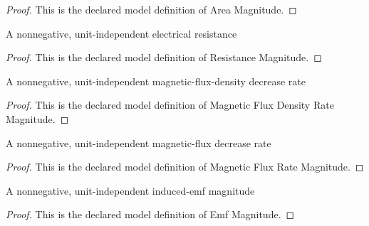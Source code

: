 \begin{proof}
  This is the declared model definition of Area Magnitude.
\end{proof}
\begin{definition}
  \label{def:physics:phyx-mini-0926:phyxminiproblems-problemphyxmini0926-resistancemagnitude}
  A nonnegative, unit-independent electrical resistance
\end{definition}
\begin{proof}
  This is the declared model definition of Resistance Magnitude.
\end{proof}
\begin{definition}
  \label{def:physics:phyx-mini-0926:phyxminiproblems-problemphyxmini0926-magneticfluxdensityratemagnitude}
  A nonnegative, unit-independent magnetic-flux-density decrease rate
\end{definition}
\begin{proof}
  This is the declared model definition of Magnetic Flux Density Rate Magnitude.
\end{proof}
\begin{definition}
  \label{def:physics:phyx-mini-0926:phyxminiproblems-problemphyxmini0926-magneticfluxratemagnitude}
  A nonnegative, unit-independent magnetic-flux decrease rate
\end{definition}
\begin{proof}
  This is the declared model definition of Magnetic Flux Rate Magnitude.
\end{proof}
\begin{definition}
  \label{def:physics:phyx-mini-0926:phyxminiproblems-problemphyxmini0926-emfmagnitude}
  A nonnegative, unit-independent induced-emf magnitude
\end{definition}
\begin{proof}
  This is the declared model definition of Emf Magnitude.
\end{proof}
